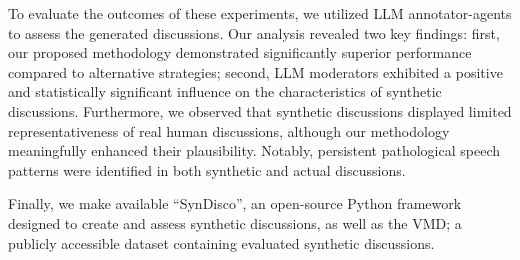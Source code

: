 To evaluate the outcomes of these experiments, we utilized \ac{LLM} annotator-agents to assess the generated discussions. Our analysis revealed two key findings: first, our proposed methodology demonstrated significantly superior performance compared to alternative strategies; second, \ac{LLM} moderators exhibited a positive and statistically significant influence on the characteristics of synthetic discussions. Furthermore, we observed that synthetic discussions displayed limited representativeness of real human discussions, although our methodology meaningfully enhanced their plausibility. Notably, persistent pathological speech patterns were identified in both synthetic and actual discussions.

Finally, we make available “SynDisco”, an open-source Python framework designed to create and assess synthetic discussions, as well as the \ac{VMD}; a publicly accessible dataset containing evaluated synthetic discussions. 